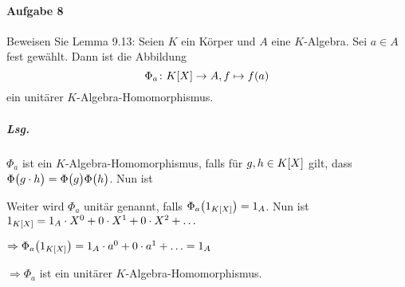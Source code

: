 \documentclass{scrreprt}
\begin{document}
\newpage
\paragraph{Aufgabe 8} Beweisen Sie Lemma 9.13:
Seien $K$ ein Körper und $A$ eine $K$-Algebra.
Sei $a \in A$ fest gewählt.
Dann ist die Abbildung
\[
  \Phi_a \colon K\qty[X] \to A, f \mapsto f(a)
\]
ein unitärer $K$-Algebra-Homomorphismus.

\subparagraph{Lsg.} $\Phi_a$ ist ein $K$-Algebra-Homomorphismus, falls für
$g, h \in K\qty[X]$ gilt, dass
$\Phi\qty\big(g \cdot h) = \Phi\qty\big(g)\Phi\qty\big(h)$.
Nun ist
Weiter wird $\Phi_a$ unitär genannt, falls $\Phi_a\qty(1_{K\qty[X]}) = 1_A$.
Nun ist $1_{K\qty[X]} = 1_A \cdot X^0 + 0 \cdot X^1 + 0 \cdot X^2 + \ldots$

$\Rightarrow \Phi_a\qty(1_{K\qty[X]}) = 1_A \cdot a^0 + 0 \cdot a^1 + \ldots
= 1_A$

$\Rightarrow \Phi_a$ ist ein unitärer $K$-Algebra-Homomorphismus.
\end{document}
